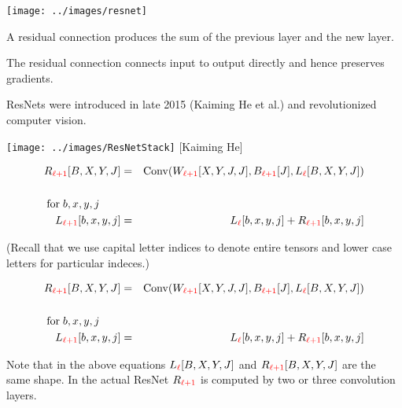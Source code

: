 {

\vfill
\texttt{[image: ../images/resnet]}
\hfill \begin{minipage}[b]{4in}
  A residual connection produces the sum of the previous layer and the new layer.

  \bigskip
  The residual connection connects input to output directly and hence preserves gradients.

  \bigskip
  ResNets were introduced in late 2015 (Kaiming He et al.) and revolutionized computer vision.
\end{minipage}



\centerline{\texttt{[image: ../images/ResNetStack]} {\large [Kaiming He]}}


\medskip
\begin{eqnarray*}
R_{\color{red} \ell+1}[B,X,Y,J] & = & \mathrm{Conv}(W_{\color{red} \ell+1}[X,Y,J,J],B_{\color{red} \ell+1}[J],L_{\color{red} \ell}[B,X,Y,J]) \\
\\
\mathrm{for}\;b,x,y,j\;\;\;\;\;\;\;\\
L_{\color{red} \ell+1}[b,x,y,j] & = & L_{\color{red}\ell}[b,x,y,j] + R_{\color{red} \ell+1}[b,x,y,j]
\end{eqnarray*}

\vfill (Recall that we use capital letter indices to denote entire tensors and lower case letters for particular indeces.)


\medskip
\begin{eqnarray*}
R_{\color{red} \ell+1}[B,X,Y,J] & = & \mathrm{Conv}(W_{\color{red} \ell+1}[X,Y,J,J],B_{\color{red} \ell+1}[J],L_{\color{red} \ell}[B,X,Y,J]) \\
\\
\mathrm{for}\;b,x,y,j\;\;\;\;\;\;\;\\
L_{\color{red} \ell+1}[b,x,y,j] & = & L_{\color{red}\ell}[b,x,y,j] + R_{\color{red} \ell+1}[b,x,y,j]
\end{eqnarray*}

\vfill Note that in the above equations $L_{\color{red} \ell}[B,X,Y,J]$ and $R_{\color{red} \ell+1}[B,X,Y,J]$ are the same shape.
\vfill
In the actual ResNet $R_{\color{red} \ell+1}$ is computed by two or three convolution layers.

}
